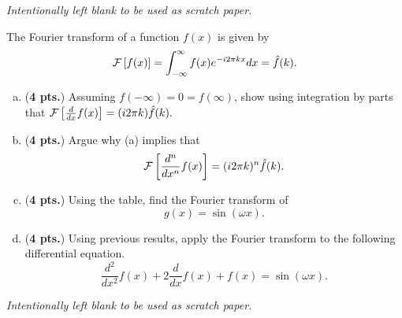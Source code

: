 \documentclass[12pt]{amsbook}
\begin{document}
\newpage
\emph{Intentionally left blank to be used as scratch paper.}\\


\newpage
\begin{problem}
The Fourier transform of a function $f(x)$ is given by
\[
\mathcal{F}\left[ f(x) \right]=\int_{-\infty}^\infty f(x) e^{-i2\pi kx}dx = \hat{f}(k).
\]
\begin{enumerate}[(a)]
	\item (\textbf{4 pts.}) Assuming $f(-\infty)=0=f(\infty)$, show using integration by parts that $\mathcal{F}\left[ \frac{d}{dx}f(x) \right] = (i2\pi k) \hat{f}(k).$
	\vspace*{4cm}
	
	\item (\textbf{4 pts.}) Argue why (a) implies that 
	\[
	\mathcal{F}\left[ \frac{d^n}{dx^n}f(x) \right] = (i2\pi k)^n \hat{f}(k).
	\]
	\vspace*{4cm}
	
	\item (\textbf{4 pts.}) Using the table, find the Fourier transform of 
	\[
	g(x) = \sin(\omega x). 
	\]
	\vspace*{4cm}
	
	\item (\textbf{4 pts.}) Using previous results, apply the Fourier transform to the following differential equation.
	\[
	\frac{d^2}{dx^2}f(x) + 2 \frac{d}{dx}f(x) + f(x) = \sin(\omega x).
	\]
\end{enumerate}
\end{problem}
\newpage
\emph{Intentionally left blank to be used as scratch paper.}\\
\end{document}
